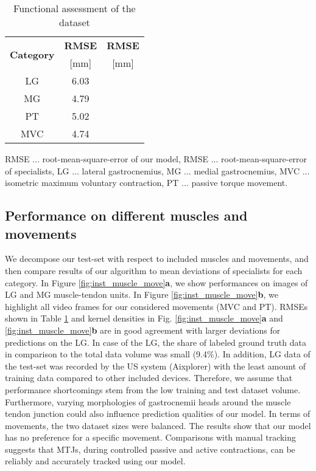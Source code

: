 \documentclass[journal,twoside,web]{ieeecolor}
\begin{document}
\begin{table}[t!]
\caption{Functional assessment of the dataset}
\label{tab:results_MuMov}
    \vspace{-0.2cm} 
    \renewcommand{\arraystretch}{1.20}
    \begin{center}
    \begin{tabular}{ccc}
\toprule
        \multirow{2}{*}{\textbf{Category}}
        &\textbf{RMSE}
        &\textbf{RMSE}\\
&[mm]
        &[mm]\\
\midrule
        \rule{0pt}{12pt}LG
        &6.03
        &\\
\rule{0pt}{12pt}MG
        &4.79
        &\\
\rule{0pt}{12pt}PT
        &5.02
        &\\
\rule{0pt}{12pt}MVC
        &4.74
        &\\
\bottomrule
    \end{tabular}
    \end{center}
        \begin{tablenotes}
        \item RMSE ... root-mean-square-error of our model, RMSE ... root-mean-square-error of specialists, LG ... lateral gastrocnemius, MG ... medial gastrocnemius, MVC ... isometric maximum voluntary contraction, PT ... passive torque movement.\\
    \end{tablenotes}
\vspace{-0.3cm}
\end{table} \subsection*{Performance on different muscles and movements}
We decompose our test-set with respect to included muscles and movements, and then compare results of our algorithm  to mean deviations of specialists  for each category. In Figure \ref{fig:inst_muscle_move}\textbf{a}, we show performances on images of LG and MG muscle-tendon units. In Figure \ref{fig:inst_muscle_move}\textbf{b}, we highlight all video frames for our considered movements (MVC and PT). RMSEs shown in Table \ref{tab:results_MuMov} and kernel densities in Fig. \ref{fig:inst_muscle_move}\textbf{a} and \ref{fig:inst_muscle_move}\textbf{b} are in good agreement with larger deviations for predictions on the LG. In case of the LG, the share of labeled ground truth data in comparison to the total data volume was small (9.4\%). In addition, LG data of the test-set was recorded by the US system (Aixplorer) with the least amount of training data compared to other included devices. Therefore, we assume that performance shortcomings stem from the low training and test dataset volume. Furthermore, varying morphologies of gastrocnemii heads around the muscle tendon junction could also influence prediction qualities of our model. In terms of movements, the two dataset sizes were balanced. The results show that our model has no preference for a specific movement. Comparisons with manual tracking suggests that MTJs, during controlled passive and active contractions, can be reliably and accurately tracked using our model.
\end{document}
